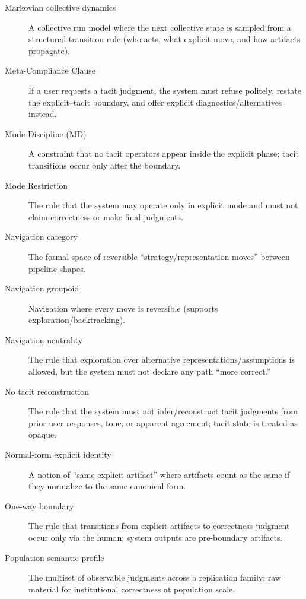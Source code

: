 \begin{description}
\item[Markovian collective dynamics] A collective run model where the next collective state is sampled from a structured transition rule (who acts, what explicit move, and how artifacts propagate).

\item[Meta-Compliance Clause] If a user requests a tacit judgment, the system must refuse politely, restate the explicit--tacit boundary, and offer explicit diagnostics/alternatives instead.

\item[Mode Discipline (MD)] A constraint that no tacit operators appear inside the explicit phase; tacit transitions occur only after the boundary.

\item[Mode Restriction] The rule that the system may operate only in explicit mode and must not claim correctness or make final judgments.

\item[Navigation category] The formal space of reversible “strategy/representation moves” between pipeline shapes.

\item[Navigation groupoid] Navigation where every move is reversible (supports exploration/backtracking).

\item[Navigation neutrality] The rule that exploration over alternative representations/assumptions is allowed, but the system must not declare any path “more correct.”

\item[No tacit reconstruction] The rule that the system must not infer/reconstruct tacit judgments from prior user responses, tone, or apparent agreement; tacit state is treated as opaque.

\item[Normal-form explicit identity] A notion of “same explicit artifact” where artifacts count as the same if they normalize to the same canonical form.

\item[One-way boundary] The rule that transitions from explicit artifacts to correctness judgment occur only via the human; system outputs are pre-boundary artifacts.

\item[Population semantic profile] The multiset of observable judgments across a replication family; raw material for institutional correctness at population scale.


\end{description}

